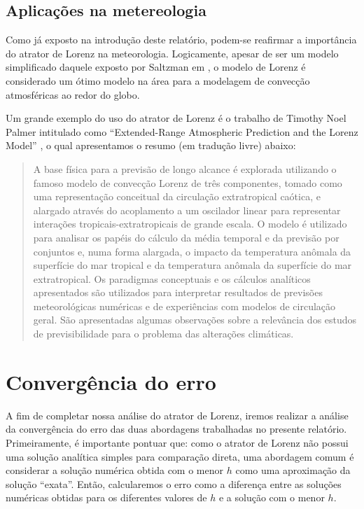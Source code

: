 \documentclass[12pt, a4paper]{article}
\begin{document}
\subsection{Aplicações na metereologia}
Como já exposto na introdução deste relatório, podem-se reafirmar a
importância do atrator de Lorenz na meteorologia. Logicamente, apesar de ser um
modelo simplificado daquele exposto por Saltzman em \cite{Saltzman1962}, o
modelo de Lorenz é considerado um ótimo modelo na área para a modelagem de
convecção atmosféricas ao redor do globo.

Um grande exemplo do uso do atrator de Lorenz é o trabalho de Timothy Noel
Palmer intitulado como ``Extended-Range Atmospheric Prediction and the Lorenz
Model'' \cite{Palmer1993}, o qual apresentamos o resumo (em tradução livre)
abaixo:
\begin{quote}
    \fontsize{10}{12}\selectfont
    A base física para a previsão de longo alcance é explorada utilizando o
    famoso modelo de convecção Lorenz de três componentes, tomado como uma
    representação conceitual da circulação extratropical caótica, e alargado
    através do acoplamento a um oscilador linear para representar interações
    tropicais-extratropicais de grande escala. O modelo é utilizado para
    analisar
    os papéis do cálculo da média temporal e da previsão por conjuntos e, numa
    forma alargada, o impacto da temperatura anômala da superfície do mar
    tropical
    e da temperatura anômala da superfície do mar extratropical. Os paradigmas
    conceptuais e os cálculos analíticos apresentados são utilizados para
    interpretar resultados de previsões meteorológicas numéricas e de
    experiências
    com modelos de circulação geral. São apresentadas algumas observações sobre
    a
    relevância dos estudos de previsibilidade para o problema das alterações
    climáticas.
\end{quote}


\newpage


\section{Convergência do erro}

A fim de completar nossa análise do atrator de Lorenz, iremos realizar a análise da convergência do erro das duas abordagens trabalhadas no presente relatório. Primeiramente, é importante pontuar que: como o atrator de Lorenz não possui uma solução analítica simples para comparação direta, uma abordagem comum é considerar a solução numérica obtida com o menor $h$ como uma aproximação da solução ``exata''. Então, calcularemos o erro como a diferença entre as soluções numéricas obtidas para os diferentes valores de $h$ e a solução com o menor $h$.
\end{document}
